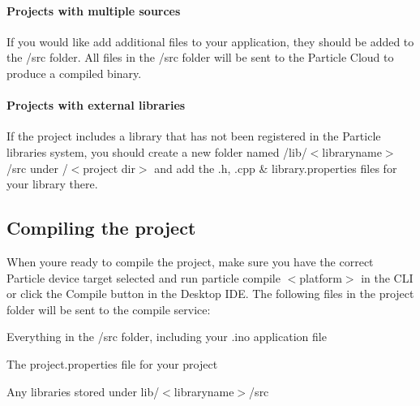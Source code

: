 \paragraph*{Projects with multiple sources}

If you would like add additional files to your application, they should be added to the {\ttfamily /src} folder. All files in the {\ttfamily /src} folder will be sent to the Particle Cloud to produce a compiled binary.

\paragraph*{Projects with external libraries}

If the project includes a library that has not been registered in the Particle libraries system, you should create a new folder named {\ttfamily /lib/$<$libraryname$>$/src} under {\ttfamily /$<$project dir$>$} and add the {\ttfamily .h}, {\ttfamily .cpp} \& {\ttfamily library.\+properties} files for your library there.

\subsection*{Compiling the project}

When you\textquotesingle{}re ready to compile the project, make sure you have the correct Particle device target selected and run {\ttfamily particle compile $<$platform$>$} in the C\+LI or click the Compile button in the Desktop I\+DE. The following files in the project folder will be sent to the compile service\+:


\begin{DoxyItemize}
\item Everything in the {\ttfamily /src} folder, including your {\ttfamily .ino} application file
\item The {\ttfamily project.\+properties} file for your project
\item Any libraries stored under {\ttfamily lib/$<$libraryname$>$/src} 
\end{DoxyItemize}